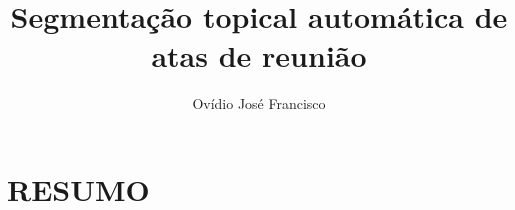 \documentclass{sig-alternate-05-2015}
\begin{document}
\title{Segmentação topical automática de atas de reunião}



\author{
\alignauthor Ovídio José Francisco\\
}

\maketitle

%

\section*{RESUMO}



\keywords{}

\begingroup
\let\clearpage\relax

	
	
		
	
	
	

\endgroup




	
\pagestyle{empty}
 	\label{sec:anexo}
 	
\end{document}
